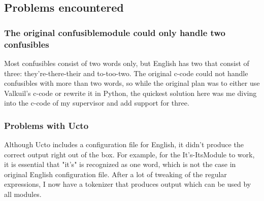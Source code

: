 \documentclass[12pt]{article}
\begin{document}
\subsection{Problems encountered}

\subsubsection{The original confusiblemodule could only handle two confusibles}
Most confusibles consist of two words only, but English has two that consist of three: they're-there-their and to-too-two. The original c-code could not handle confusibles with more than two words, so while the original plan was to either use Valkuil's c-code or rewrite it in Python, the quickest solution here was me diving into the c-code of my supervisor and add support for three.

\subsubsection{Problems with Ucto}
Although Ucto includes a configuration file for English, it didn't produce the correct output right out of the box. For example, for the It's-ItsModule to work, it is essential that "it's" is recognized as one word, which is not the case in original English configuration file. After a lot of tweaking of the regular expressions, I now have a tokenizer that produces output which can be used by all modules.

\end{document}

